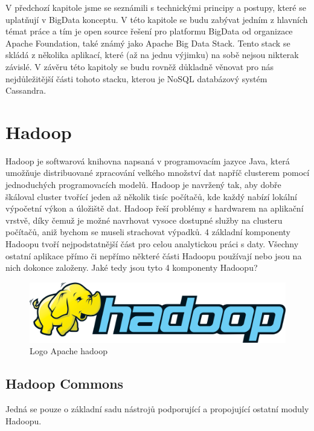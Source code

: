 V předchozí kapitole jsme se seznámili s technickými principy a postupy, které se uplatňují v BigData konceptu. V této kapitole se budu zabývat jedním z hlavních témat práce a tím je open source řešení pro platformu BigData od organizace Apache Foundation, také známý jako Apache Big Data Stack. Tento stack se skládá z několika aplikací, které (až na jednu výjimku) na sobě nejsou nikterak závislé. V závěru této kapitoly se budu rovněž důkladně věnovat pro nás nejdůležitější části tohoto stacku, kterou je NoSQL databázový systém Cassandra.

\section{Hadoop}




Hadoop je softwarová knihovna napsaná v programovacím jazyce Java, která umožňuje distribuované zpracování velkého množství dat napříč clusterem pomocí jednoduchých programovacích modelů. Hadoop je navržený tak, aby dobře škáloval cluster tvořící jeden až několik tisíc počítačů, kde každý nabízí lokální výpočetní výkon a úložiště dat. Hadoop řeší problémy s hardwarem na aplikační vrstvě, díky čemuž je možné navrhovat vysoce dostupné služby na clusteru počítačů, aniž bychom se museli strachovat výpadků. 4 základní komponenty Hadoopu tvoří nejpodstatnější část pro celou analytickou práci s daty. Všechny ostatní aplikace přímo či nepřímo některé části Hadoopu používají nebo jsou na nich dokonce založeny. Jaké tedy jsou tyto 4 komponenty Hadoopu?


\begin{figure}[h]
\centering
\includegraphics[scale=0.15]{images/hadoop}
\caption{Logo Apache hadoop}
\label{fig:yarn}

\end{figure}


\subsection{Hadoop Commons}
Jedná se pouze o základní sadu nástrojů podporující a propojující ostatní moduly Hadoopu.


